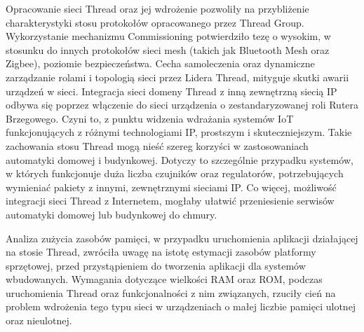 Opracowanie sieci Thread oraz jej wdrożenie pozwoliły na przybliżenie charakterystyki stosu protokołów opracowanego przez Thread Group. Wykorzystanie mechanizmu Commissioning potwierdziło tezę o wysokim, w stosunku do innych protokołów sieci mesh (takich jak Bluetooth Mesh oraz Zigbee), poziomie bezpieczeństwa. Cecha samoleczenia oraz dynamiczne zarządzanie rolami i topologią sieci przez Lidera Thread, mityguje skutki awarii urządzeń w sieci. Integracja sieci domeny Thread z inną zewnętrzną siecią IP odbywa się poprzez włączenie do sieci urządzenia o zestandaryzowanej roli Rutera Brzegowego. Czyni to, z punktu widzenia wdrażania systemów IoT funkcjonujących z różnymi technologiami IP, prostszym i skuteczniejszym. Takie zachowania stosu Thread mogą nieść szereg korzyści w zastosowaniach automatyki domowej i budynkowej. Dotyczy to szczególnie przypadku systemów, w których funkcjonuje duża liczba czujników oraz regulatorów, potrzebujących wymieniać pakiety z innymi, zewnętrznymi sieciami IP. Co więcej, możliwość integracji sieci Thread z Internetem, mogłaby ułatwić przeniesienie serwisów automatyki domowej lub budynkowej do chmury.

Analiza zużycia zasobów pamięci, w przypadku uruchomienia aplikacji działającej na stosie Thread, zwróciła uwagę na istotę estymacji zasobów platformy sprzętowej, przed przystąpieniem do tworzenia aplikacji dla systemów wbudowanych. Wymagania dotyczące wielkości RAM oraz ROM, podczas uruchomienia Thread oraz funkcjonalności z nim związanych, rzuciły cień na problem wdrożenia tego typu sieci w urządzeniach o małej liczbie pamięci ulotnej oraz nieulotnej.